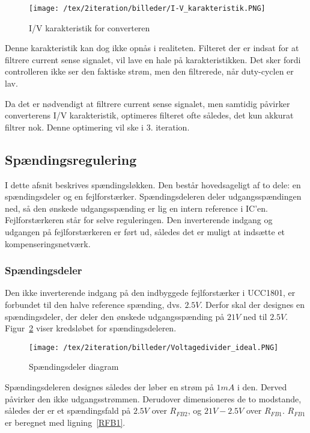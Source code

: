 \begin{figure}[H]
	\center
	\texttt{[image: /tex/2iteration/billeder/I-V\_karakteristik.PNG]}
	\caption{I/V karakteristik for converteren}
	\label{fig:I-V_karateristik}
\end{figure}

Denne karakteristik kan dog ikke opnås i realiteten. Filteret der er indsat for at filtrere current sense signalet, vil lave en hale på karakteristikken. Det sker fordi controlleren ikke ser den faktiske strøm, men den filtrerede, når duty-cyclen er lav. 

Da det er nødvendigt at filtrere current sense signalet, men samtidig påvirker converterens I/V karakteristik, optimeres filteret ofte således, det kun akkurat filtrer nok. Denne optimering vil ske i 3. iteration. 

\subsection{Spændingsregulering} \label{V_loop}
I dette afsnit beskrives spændingsløkken. Den består hovedsageligt af to dele: en spændingsdeler og en fejlforstærker. Spændingsdeleren deler udgangsspændingen ned, så den ønskede udgangsspænding er lig en intern reference i IC'en. Fejlforstærkeren står for selve reguleringen. Den inverterende indgang og udgangen på fejlforstærkeren er ført ud, således det er muligt at indsætte et kompenseringsnetværk.

\subsubsection{Spændingsdeler}
Den ikke inverterende indgang på den indbyggede fejlforstærker i UCC1801, er forbundet til den halve reference spænding, dvs. $2.5V$. Derfor skal der designes en spændingsdeler, der deler den ønskede udgangsspænding på $21V$ ned til $2.5V$. Figur~\ref{fig:Voltagedivider_ideal} viser kredsløbet for spændingsdeleren. 

\begin{figure}[H]
	\center
	\texttt{[image: /tex/2iteration/billeder/Voltagedivider\_ideal.PNG]}
	\caption{Spændingsdeler diagram}
	\label{fig:Voltagedivider_ideal}
\end{figure}

Spændingsdeleren designes således der løber en strøm på $1mA$ i den. Derved påvirker den ikke udgangsstrømmen. Derudover dimensioneres de to modstande, således der er et spændingsfald på $2.5V$ over $R_{FB2}$, og $21V-2.5V$ over $R_{FB1}$. $R_{FB1}$ er beregnet med ligning~\ref{RFB1}.

